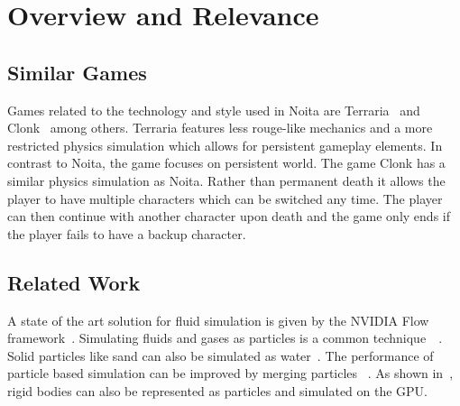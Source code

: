 \documentclass[a4paper]{article}
\begin{document}
\section{Overview and Relevance}

\subsection{Similar Games}
Games related to the technology and style used in Noita are Terraria~\cite{terraria} and Clonk~\cite{clonk} among others.
Terraria features less rouge-like mechanics and a more restricted physics simulation which allows for persistent 
gameplay elements. In contrast to Noita, the game focuses on persistent world. The game Clonk has a similar physics simulation as Noita. Rather than permanent death it allows the player to have multiple characters which can be switched any time.
The player can then continue with another character upon death and the game only ends if the player fails to have a backup character.\newline\newline\noindent

\subsection{Related Work}

A state of the art solution for fluid simulation is given by the NVIDIA Flow framework~\cite{nvidia_flow}.
Simulating fluids and gases as particles is a common technique~\cite{gdc_green}~\cite{shallow_water_simulation}. Solid particles like sand can also be simulated as water~\cite{sand_as_fluid}. The performance of particle based simulation can be improved by merging particles ~\cite{adaptive_particle_water}. As shown in~\cite{gpu_solids}, rigid bodies can also be represented as particles and simulated on the GPU.
\end{document}
